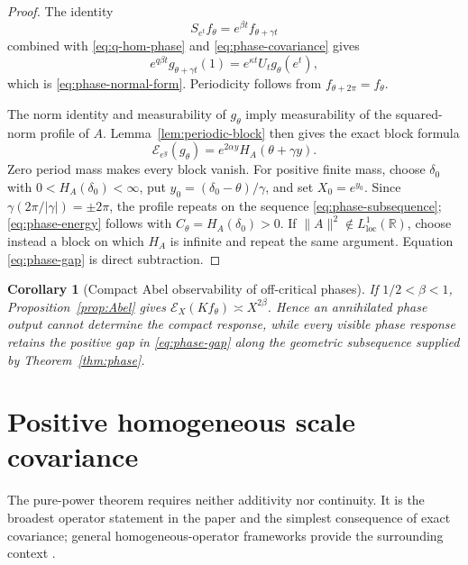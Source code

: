 \documentclass[11pt,a4paper]{amsart}
\newtheorem{corollary}[theorem]{Corollary}
\theoremstyle{definition}
\newcommand{\R}{\mathbb R}
\newcommand{\norm}[1]{\lVert #1\rVert}
\newcommand{\cE}{\mathcal E}
\begin{document}
\begin{proof}
The identity
\[
 S_{e^t}f_\theta=e^{\beta t}f_{\theta+\gamma t}
\]
combined with \eqref{eq:q-hom-phase} and \eqref{eq:phase-covariance} gives
\[
 e^{q\beta t}g_{\theta+\gamma t}(1)
 =e^{\kappa t}U_tg_\theta(e^t),
\]
which is \eqref{eq:phase-normal-form}.  Periodicity follows from
$f_{\theta+2\pi}=f_\theta$.

The norm identity and measurability of $g_\theta$ imply measurability of the
squared-norm profile of $A$.  Lemma~\ref{lem:periodic-block} then gives the exact block formula
\[
 \cE_{e^y}(g_\theta)
 =e^{2\alpha y}H_A(\theta+\gamma y).
\]
Zero period mass makes every block vanish.  For positive finite mass, choose
$\delta_0$ with $0<H_A(\delta_0)<\infty$, put
$y_0=(\delta_0-\theta)/\gamma$, and set $X_0=e^{y_0}$.  Since
$\gamma(2\pi/|\gamma|)=\pm2\pi$, the profile repeats on the sequence
\eqref{eq:phase-subsequence}; \eqref{eq:phase-energy} follows with
$C_\theta=H_A(\delta_0)>0$.  If
$\norm{A}^2\notin L^1_{\mathrm{loc}}(\R)$, choose
instead a block on which $H_A$ is infinite and repeat the same argument.
Equation \eqref{eq:phase-gap} is direct subtraction.
\end{proof}

\begin{corollary}[Compact Abel observability of off-critical phases]\label{cor:phase-Abel}
If $1/2<\beta<1$, Proposition~\ref{prop:Abel} gives
$\cE_X(Kf_\theta)\asymp X^{2\beta}$.  Hence an annihilated phase output cannot determine the compact response, while every visible phase response retains the positive gap in \eqref{eq:phase-gap} along the geometric subsequence supplied by Theorem~\ref{thm:phase}.
\end{corollary}

\section{Positive homogeneous scale covariance}\label{sec:homogeneous}

The pure-power theorem requires neither additivity nor continuity.  It is the broadest operator statement in the paper and the simplest consequence of exact covariance; general homogeneous-operator frameworks provide the surrounding context \cite{AvetisyanKarapetyants2021}.
\end{document}

